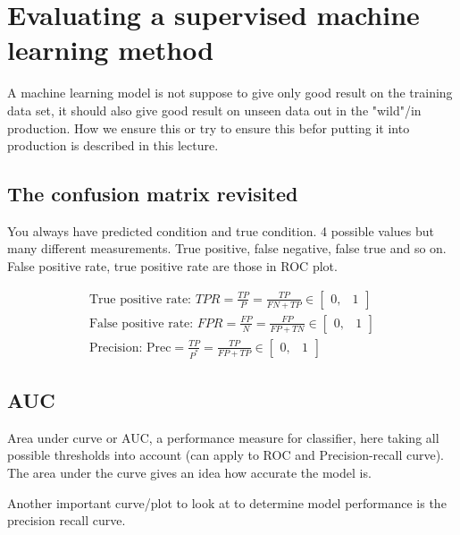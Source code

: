 
\section{Evaluating a supervised machine learning method}
A machine learning model is not suppose to give only good result on the training data set, it should also give good result on unseen data out in the "wild"/in production. How we ensure this or try to ensure this befor putting it into production is described in this lecture. 

\subsection*{The confusion matrix revisited}
You always have predicted condition and true condition. 4 possible values but many different measurements. True positive, false negative, false true and so on. False positive rate, true positive rate are those in ROC plot. 

\begin{equation}
\begin{aligned}
\text{True positive rate: }TPR = \frac{TP} {P} = \frac{TP} {FN+TP} \in \begin{bmatrix} 0,& 1 \end{bmatrix} \\
\text{False positive rate: }FPR = \frac{FP} {N} = \frac{FP} {FP+TN} \in \begin{bmatrix} 0,& 1 \end{bmatrix} \\
\text{Precision: Prec} = \frac{TP} {P^{*}} = \frac{TP} {FP + TP} \in \begin{bmatrix} 0,& 1 \end{bmatrix}
\end{aligned}
\end{equation}

\subsection*{AUC}
Area under curve or AUC, a performance measure for classifier, here taking all possible thresholds into account (can apply to ROC and Precision-recall curve). The area under the curve gives an idea how accurate the model is. 

Another important curve/plot to look at to determine model performance is the precision recall curve. 


